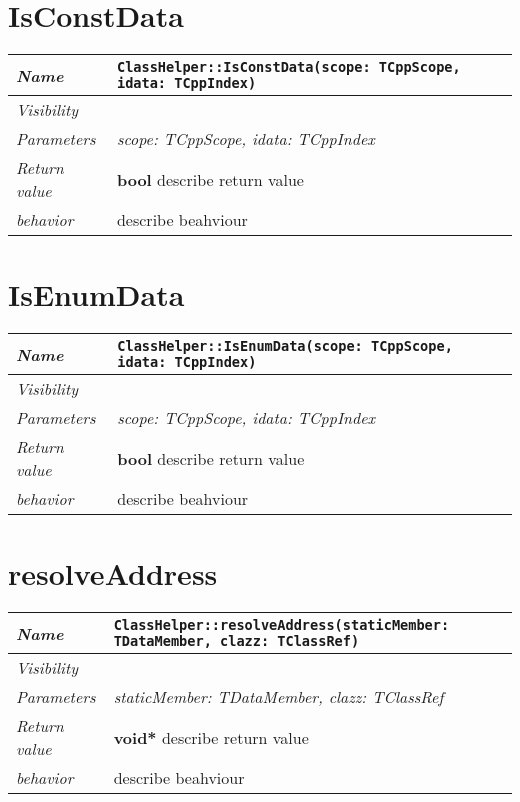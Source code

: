  \section{IsConstData}
\begin{longtable}{p{3cm} @{\hskip 1cm} p{12cm}}
 \hline
\textit{Name} & \texttt{ClassHelper::IsConstData(scope: TCppScope, idata: TCppIndex)}\\
\hline
 \textit{Visibility} & \\
\hline
\textit{Parameters} & \textit{scope: TCppScope, idata: TCppIndex}\\
\hline
\textit{Return value} & \textbf{ bool} describe return value\\
  \hline
 \textit{behavior} & describe beahviour \\
\hline
\end{longtable} \pagebreak
 \section{IsEnumData}
\begin{longtable}{p{3cm} @{\hskip 1cm} p{12cm}}
 \hline
\textit{Name} & \texttt{ClassHelper::IsEnumData(scope: TCppScope, idata: TCppIndex)}\\
\hline
 \textit{Visibility} & \\
\hline
\textit{Parameters} & \textit{scope: TCppScope, idata: TCppIndex}\\
\hline
\textit{Return value} & \textbf{ bool} describe return value\\
  \hline
 \textit{behavior} & describe beahviour \\
\hline
\end{longtable} \pagebreak
 \section{resolveAddress}
\begin{longtable}{p{3cm} @{\hskip 1cm} p{12cm}}
 \hline
\textit{Name} & \texttt{ClassHelper::resolveAddress(staticMember: TDataMember, clazz: TClassRef)}\\
\hline
 \textit{Visibility} & \\
\hline
\textit{Parameters} & \textit{staticMember: TDataMember, clazz: TClassRef}\\
\hline
\textit{Return value} & \textbf{ void*} describe return value\\
  \hline
 \textit{behavior} & describe beahviour \\
\hline
\end{longtable} \pagebreak
